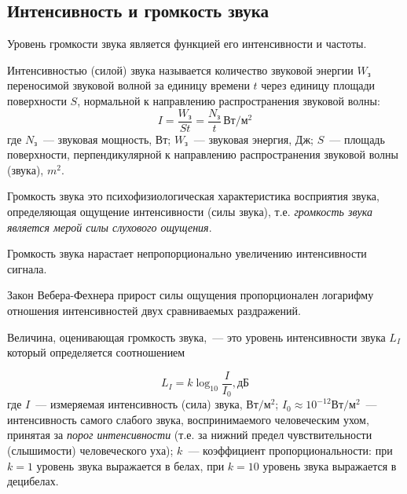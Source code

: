 \documentclass{beamer}
\begin{document}
\subsection{Интенсивность и громкость звука}
\begin{frame}
  Уровень громкости звука является функцией его интенсивности и частоты. 

  \begin{block}{Интенсивностью (силой) звука} 
  называется количество звуковой энергии $W_\text{з}$ переносимой звуковой волной за единицу времени $t$ через единицу площади поверхности $S$, нормальной к направлению распространения звуковой волны:
\[I=\frac{W_\text{з}}{St}=\frac{N_\text{з}}{t}\, \text{Вт}/\text{м}^2\]
где $N_\text{з}$~--- звуковая мощность, Вт; $W_\text{з}$~--- звуковая энергия, Дж; $S$~--- площадь поверхности, перпендикулярной к направлению распространения звуковой волны (звука), $m^2$.
  \end{block}

  \begin{block}{Громкость звука}
  это психофизиологическая характеристика восприятия звука, определяющая ощущение интенсивности (силы звука), т.е. {\itshape громкость звука является мерой силы слухового ощущения}. 
  \end{block}
 
\end{frame}

\begin{frame}
Громкость звука нарастает непропорционально увеличению интенсивности сигнала. 
\begin{block}{Закон Вебера-Фехнера}
прирост силы ощущения пропорционален логарифму отношения интенсивностей двух сравниваемых раздражений.
\end{block}

Величина, оценивающая громкость звука,~--- это уровень интенсивности звука $L_I$ который определяется соотношением

\[L_I=k \log_{10}{\frac{I}{I_0}}, \text{дБ}\]
где $I$~--- измеряемая интенсивность (сила) звука, $\text{Вт}/\text{м}^2$; $I_0\approx 10^{-12} \text{Вт}/\text{м}^2$~--- интенсивность самого слабого звука, воспринимаемого человеческим ухом, принятая за {\itshape порог интенсивности} (т.е. за нижний предел чувствительности (слышимости) человеческого уха); $k$~--- коэффициент пропорциональности: при $k=1$ уровень звука выражается в белах, при $k=10$ уровень звука выражается в децибелах.
\end{frame}
\end{document}
